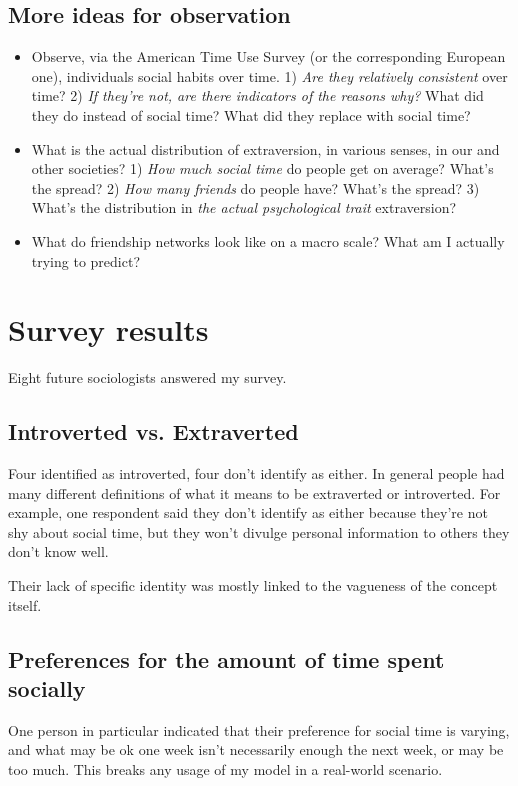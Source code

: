 \documentclass[]{article}
\begin{document}
	\subsection{More ideas for observation}
	\begin{itemize}
		\item 
			Observe, via the American Time Use Survey (or the corresponding European one), individuals social habits over time. 1) \textit{Are they relatively consistent} over time? 2) \textit{If they're not, are there indicators of the reasons why?} What did they do instead of social time? What did they replace with social time?
		\item 
			What is the actual distribution of extraversion, in various senses, in our and other societies? 1) \textit{How much social time} do people get on average? What's the spread? 2) \textit{How many friends} do people have? What's the spread? 3) What's the distribution in \textit{the actual psychological trait} extraversion?
		\item 
			What do friendship networks look like on a macro scale? What am I actually trying to predict?
			
	\end{itemize}

	\section{Survey results}
	Eight future sociologists answered my survey.
	
	\subsection{Introverted vs. Extraverted}
	Four identified as introverted, four don't identify as either. 
	In general people had many different definitions of what it means to be extraverted or introverted.
	For example, one respondent said they don't identify as either because they're not shy about social time, but they won't divulge personal information to others they don't know well.
	
	Their lack of specific identity was mostly linked to the vagueness of the concept itself.
	
	\subsection{Preferences for the amount of time spent socially}
	One person in particular indicated that their preference for social time is varying, and what may be ok one week isn't necessarily enough the next week, or may be too much.
	This breaks any usage of my model in a real-world scenario.
	
\end{document}
